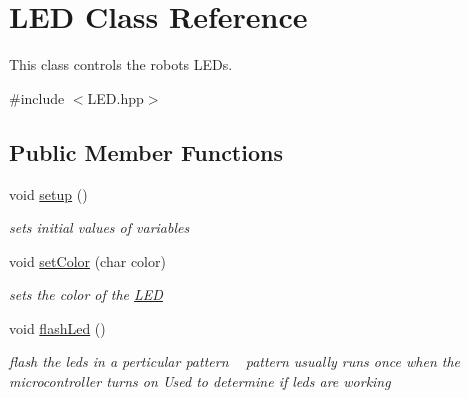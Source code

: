\hypertarget{class_l_e_d}{}\section{L\+ED Class Reference}
\label{class_l_e_d}


This class controls the robots L\+E\+Ds.  




{\ttfamily \#include $<$L\+E\+D.\+hpp$>$}

\subsection*{Public Member Functions}
\begin{DoxyCompactItemize}
\item 
\mbox{\label{class_l_e_d_abb089672733ef180aa8cddc8d3a37d9e}} 
void \mbox{\hyperlink{class_l_e_d_abb089672733ef180aa8cddc8d3a37d9e}{setup}} ()
\begin{DoxyCompactList}\small\item\em sets initial values of variables \end{DoxyCompactList}\item 
void \mbox{\hyperlink{class_l_e_d_ad122ee4ef58452558498c249fc293870}{set\+Color}} (char color)
\begin{DoxyCompactList}\small\item\em sets the color of the \mbox{\hyperlink{class_l_e_d}{L\+ED}} \end{DoxyCompactList}\item 
\mbox{\label{class_l_e_d_aaff2c983e84d429526ed087653bab10c}} 
void \mbox{\hyperlink{class_l_e_d_aaff2c983e84d429526ed087653bab10c}{flash\+Led}} ()
\begin{DoxyCompactList}\small\item\em flash the leds in a perticular pattern ~\newline
pattern usually runs once when the microcontroller turns on Used to determine if leds are working \end{DoxyCompactList}\end{DoxyCompactItemize}
